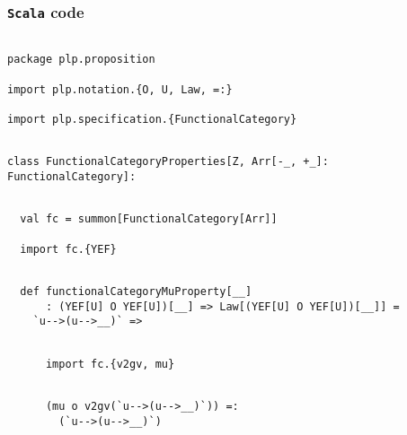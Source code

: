 \documentclass[11pt]{article}
\newcommand{\code}{\subsubsection{{\tt Scala} code}\begingroup\rm \vspace{12pt}}
\def\edefn{\endgroup\par\pagebreak[2]\addvspace{\medskipamount}}
\let\ecode=\edefn
\begin{document}
\code
\begin{mdframed}[backgroundcolor=lightgray!20] 
\begin{lstlisting}

package plp.proposition

import plp.notation.{O, U, Law, =:}

import plp.specification.{FunctionalCategory}
\end{lstlisting}
\end{mdframed}
\vspace{6pt}
\begin{mdframed}[backgroundcolor=lightgray!20] 
\begin{lstlisting}

class FunctionalCategoryProperties[Z, Arr[-_, +_]: FunctionalCategory]:
\end{lstlisting}
\end{mdframed}
\vspace{6pt}
\begin{mdframed}[backgroundcolor=lightgray!20] 
\begin{lstlisting}

  val fc = summon[FunctionalCategory[Arr]]

  import fc.{YEF}
\end{lstlisting}
\end{mdframed}
\vspace{6pt}
\begin{mdframed}[backgroundcolor=lightgray!20] 
\begin{lstlisting}  

  def functionalCategoryMuProperty[__]
      : (YEF[U] O YEF[U])[__] => Law[(YEF[U] O YEF[U])[__]] =
    `u-->(u-->__)` =>
\end{lstlisting}
\end{mdframed}
\vspace{6pt}
\begin{mdframed}[backgroundcolor=lightgray!20] 
\begin{lstlisting}

      import fc.{v2gv, mu}
\end{lstlisting}
\end{mdframed}
\vspace{6pt}
\begin{mdframed}[backgroundcolor=lightgray!20] 
\begin{lstlisting}

      (mu o v2gv(`u-->(u-->__)`)) =:
        (`u-->(u-->__)`)
\end{lstlisting}
\end{mdframed}    
\ecode
\end{document}
